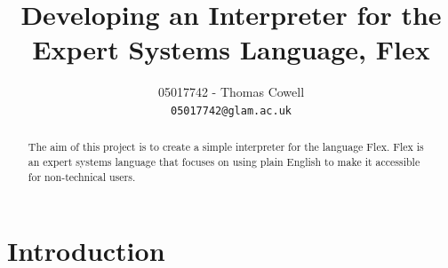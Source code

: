 \documentclass[12pt]{report}
\begin{document}
\title{Developing an Interpreter for the Expert Systems Language, Flex}
\author{05017742 - Thomas Cowell\\
		\texttt{05017742@glam.ac.uk}}

\maketitle

\begin{abstract}
The aim of this project is to create a simple interpreter for the language Flex.  Flex is an expert systems language that focuses on using plain English to make it accessible for
non-technical users.
\end{abstract}

\pagestyle{plain}

\tableofcontents

\cleardoublepage
{}

\chapter{Introduction}
\end{document}
